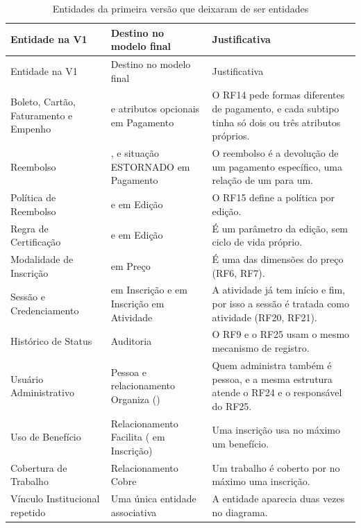 \begin{longtable}{@{}L{3.4cm} L{4.5cm} L{6.1cm}@{}}
\caption{Entidades da primeira versão que deixaram de ser entidades}\label{tab:removidas}\\
\toprule
Entidade na V1 & Destino no modelo final & Justificativa\\
\midrule
\endfirsthead
\toprule
Entidade na V1 & Destino no modelo final & Justificativa\\
\midrule
\endhead
\bottomrule
\endfoot
Boleto, Cartão, Faturamento e Empenho &  e atributos opcionais em Pagamento & O RF14 pede formas diferentes de pagamento, e cada subtipo tinha só dois ou três atributos próprios.\\
Reembolso & ,  e situação ESTORNADO em Pagamento & O reembolso é a devolução de um pagamento específico, uma relação de um para um.\\
Política de Reembolso &  e  em Edição & O RF15 define a política por edição.\\
Regra de Certificação &  e  em Edição & É um parâmetro da edição, sem ciclo de vida próprio.\\
Modalidade de Inscrição &  em Preço & É uma das dimensões do preço (RF6, RF7).\\
Sessão e Credenciamento &  em Inscrição e  em Inscrição em Atividade & A atividade já tem início e fim, por isso a sessão é tratada como atividade (RF20, RF21).\\
Histórico de Status & Auditoria & O RF9 e o RF25 usam o mesmo mecanismo de registro.\\
Usuário Administrativo & Pessoa e relacionamento Organiza () & Quem administra também é pessoa, e a mesma estrutura atende o RF24 e o responsável do RF25.\\
Uso de Benefício & Relacionamento Facilita ( em Inscrição) & Uma inscrição usa no máximo um benefício.\\
Cobertura de Trabalho & Relacionamento Cobre & Um trabalho é coberto por no máximo uma inscrição.\\
Vínculo Institucional repetido & Uma única entidade associativa & A entidade aparecia duas vezes no diagrama.\\
\end{longtable}


